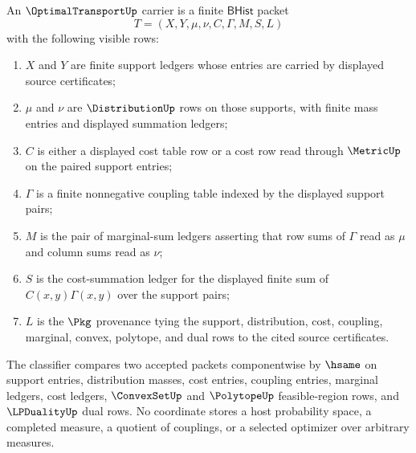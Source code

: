 \begin{definition}
\label{def:optimaltransport-finite-coupling-carrier}
An $\OptimalTransportUp$ carrier is a finite $\mathsf{BHist}$ packet
$$
T=(X,Y,\mu,\nu,C,\Gamma,M,S,L)
$$
with the following visible rows:
\begin{enumerate}
\item $X$ and $Y$ are finite support ledgers whose entries are carried by displayed source certificates;
\item $\mu$ and $\nu$ are $\DistributionUp$ rows on those supports, with finite mass entries and displayed summation ledgers;
\item $C$ is either a displayed cost table row or a cost row read through $\MetricUp$ on the paired support entries;
\item $\Gamma$ is a finite nonnegative coupling table indexed by the displayed support pairs;
\item $M$ is the pair of marginal-sum ledgers asserting that row sums of $\Gamma$ read as $\mu$ and column sums read as $\nu$;
\item $S$ is the cost-summation ledger for the displayed finite sum of $C(x,y)\Gamma(x,y)$ over the support pairs;
\item $L$ is the $\Pkg$ provenance tying the support, distribution, cost, coupling, marginal, convex, polytope, and dual rows to the cited source certificates.
\end{enumerate}
The classifier compares two accepted packets componentwise by $\hsame$ on support entries, distribution masses, cost entries, coupling entries, marginal ledgers, cost ledgers, $\ConvexSetUp$ and $\PolytopeUp$ feasible-region rows, and $\LPDualityUp$ dual rows. No coordinate stores a host probability space, a completed measure, a quotient of couplings, or a selected optimizer over arbitrary measures.
\end{definition}


